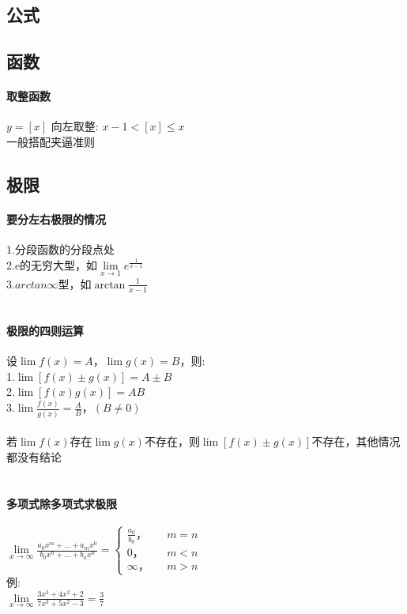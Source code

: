 \documentclass{article}
\begin{document}
\begin{flushleft}
	\LARGE
	
	\section{公式}
	
	\subsection{函数}
	
	\paragraph{取整函数}
	$y=[x]$ 向左取整: $x-1<[x]\leq x$\\
	一般搭配夹逼准则\\\huge

	\subsection{极限}
	
	\paragraph{要分左右极限的情况}
	1.分段函数的分段点处\\
	2.e的无穷大型，如$\lim\limits_{x\to 1} e^{\frac{1}{x-1}}$\\
	3.$arctan\infty$型，如$\arctan{\frac{1}{x-1}}$\\
	~\\
	\paragraph{极限的四则运算}
	设$\lim f(x)=A，\lim g(x)=B$，则:\\
	1.$\lim [f(x)\pm g(x)]=A\pm B$\\
	2.$\lim [f(x)g(x)]=AB$\\
	3.$\lim \frac{f(x)}{g(x)} =\frac{A}{B}，(B\neq 0)$\\
	~\\
	若$\lim f(x)$存在$\lim g(x)$不存在，则$\lim [f(x)\pm g(x)]$不存在，其他情况都没有结论\\
	~\\
	\paragraph{多项式除多项式求极限}
	$\lim\limits_{x\to \infty} \frac{a_0x^m+...+a_mx^0}{b_0x^n+...+b_nx^0}=
	\left\{
	\begin{array}{rcl}
	\frac{a_0}{b_0}，& & {m=n}\\
	0，& & {m<n}\\
	\infty，& & {m>n}
	\end{array} \right.$\\
	例:\\
	$\lim\limits_{x\to \infty} \frac{3x^3+4x^2+2}{7x^3+5x^2-3} = \frac{3}{7}$\\
	~\\

\end{flushleft}
\end{document}
